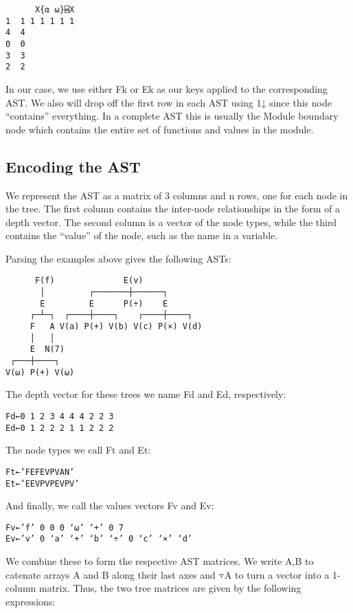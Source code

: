 \documentclass[numbers,preprint]{sigplanconf}
\begin{document}
\begin{verbatim}
      X{⍺ ⍵}⌸X
1  1 1 1 1 1 1 
4  4           
0  0           
3  3           
2  2
\end{verbatim}

In our case, we use either Fk or Ek as our keys applied to the corresponding AST. We also will drop off 
the first row in each AST using 1↓ since this node “contains” everything. In a complete AST this is 
usually the Module boundary node which contains the entire set of functions and values in the module.
\subsection{Encoding the AST}

We represent the AST as a matrix of 3 columns and n rows, one for each node in the tree. The first column 
contains the inter-node relationships in the form of a depth vector. The second column is a vector of the 
node types, while the third contains the “value” of the node, such as the name in a variable. 

Parsing the examples above gives the following ASTs:

\begin{verbatim}
      F(f)              E(v)
       │         ┌───────┼──────┐
       E         E      P(÷)    E
     ┌─┴─┐  ┌────┼────┐    ┌────┼────┐
     F   A V(a) P(+) V(b) V(c) P(×) V(d)
     │   │
     E  N(7) 
 ┌───┼────┐
V(⍵) P(+) V(⍵)
\end{verbatim}

The depth vector for these trees we name Fd and Ed, respectively:

\begin{verbatim}
Fd←0 1 2 3 4 4 4 2 2 3
Ed←0 1 2 2 2 1 1 2 2 2
\end{verbatim}

The node types we call Ft and Et:

\begin{verbatim}
Ft←’FEFEVPVAN’
Et←’EEVPVPEVPV’
\end{verbatim}

And finally, we call the values vectors Fv and Ev:

\begin{verbatim}
Fv←’f’ 0 0 0 ‘⍵’ ‘+’ 0 7
Ev←’v’ 0 ‘a’ ‘+’ ‘b’ ‘÷’ 0 ‘c’ ‘×’ ‘d’
\end{verbatim}

We combine these to form the respective AST matrices. We write A,B to catenate arrays A and B along their 
last axes and ⍪A to turn a vector into a 1-column matrix. Thus, the two tree matrices are given by the 
following expressions:
\end{document}
